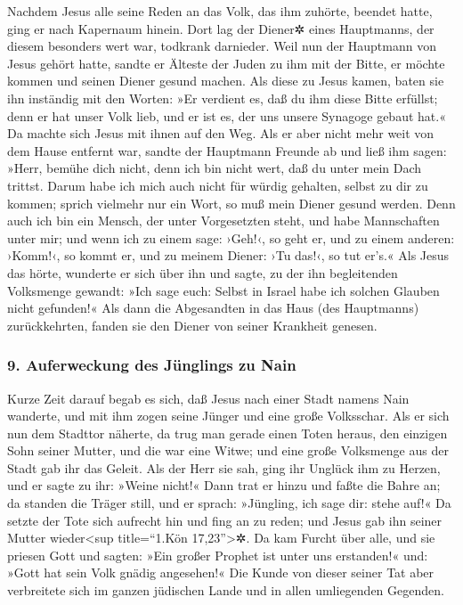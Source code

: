 Nachdem Jesus alle seine Reden an das Volk, das ihm
zuhörte, beendet hatte, ging er nach Kapernaum hinein. 
Dort lag der Diener✲ eines Hauptmanns, der diesem besonders wert war,
todkrank darnieder.  Weil nun der Hauptmann von Jesus
gehört hatte, sandte er Älteste der Juden zu ihm mit der Bitte, er
möchte kommen und seinen Diener gesund machen.  Als diese
zu Jesus kamen, baten sie ihn inständig mit den Worten: »Er verdient es,
daß du ihm diese Bitte erfüllst;  denn er hat unser Volk
lieb, und er ist es, der uns unsere Synagoge gebaut hat.« 
Da machte sich Jesus mit ihnen auf den Weg. Als er aber nicht mehr weit
von dem Hause entfernt war, sandte der Hauptmann Freunde ab und ließ ihm
sagen: »Herr, bemühe dich nicht, denn ich bin nicht wert, daß du unter
mein Dach trittst.  Darum habe ich mich auch nicht für
würdig gehalten, selbst zu dir zu kommen; sprich vielmehr nur ein Wort,
so muß mein Diener gesund werden.  Denn auch ich bin ein
Mensch, der unter Vorgesetzten steht, und habe Mannschaften unter mir;
und wenn ich zu einem sage: ›Geh!‹, so geht er, und zu einem anderen:
›Komm!‹, so kommt er, und zu meinem Diener: ›Tu das!‹, so tut er's.«
 Als Jesus das hörte, wunderte er sich über ihn und sagte,
zu der ihn begleitenden Volksmenge gewandt: »Ich sage euch: Selbst in
Israel habe ich solchen Glauben nicht gefunden!«  Als
dann die Abgesandten in das Haus (des Hauptmanns) zurückkehrten, fanden
sie den Diener von seiner Krankheit genesen.

\hypertarget{auferweckung-des-juxfcnglings-zu-nain}{%
\subsubsection{9. Auferweckung des Jünglings zu
Nain}\label{auferweckung-des-juxfcnglings-zu-nain}}

 Kurze Zeit darauf begab es sich, daß Jesus nach einer
Stadt namens Nain wanderte, und mit ihm zogen seine Jünger und eine
große Volksschar.  Als er sich nun dem Stadttor näherte,
da trug man gerade einen Toten heraus, den einzigen Sohn seiner Mutter,
und die war eine Witwe; und eine große Volksmenge aus der Stadt gab ihr
das Geleit.  Als der Herr sie sah, ging ihr Unglück ihm
zu Herzen, und er sagte zu ihr: »Weine nicht!«  Dann trat
er hinzu und faßte die Bahre an; da standen die Träger still, und er
sprach: »Jüngling, ich sage dir: stehe auf!«  Da setzte
der Tote sich aufrecht hin und fing an zu reden; und Jesus gab ihn
seiner Mutter wieder\textless sup title=``1.Kön 17,23''\textgreater✲.
 Da kam Furcht über alle, und sie priesen Gott und
sagten: »Ein großer Prophet ist unter uns erstanden!« und: »Gott hat
sein Volk gnädig angesehen!«  Die Kunde von dieser seiner
Tat aber verbreitete sich im ganzen jüdischen Lande und in allen
umliegenden Gegenden.


